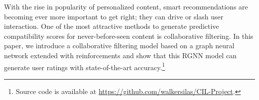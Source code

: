 With the rise in popularity of personalized content, smart recommendations are becoming ever more important to get right; they can drive or slash user interaction. One of the most attractive methods to generate predictive compatibility scores for never-before-seen content is collaborative filtering. In this paper, we introduce a collaborative filtering model based on a graph neural network extended with reinforcements and show that this RGNN model can generate user ratings with state-of-the-art accuracy.\footnote{Source code is available at \url{https://github.com/walkersilas/CIL-Project}.}